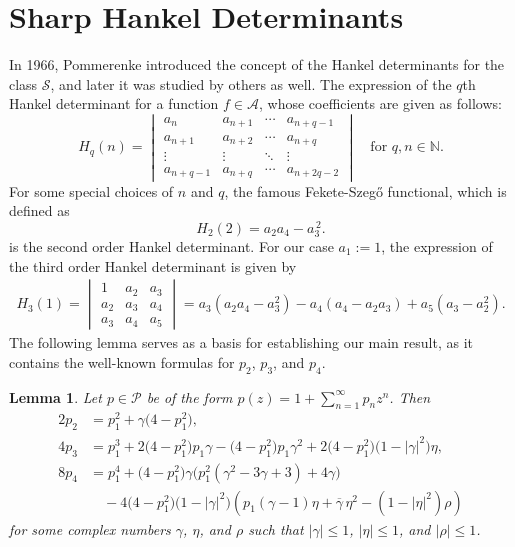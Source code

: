 \documentclass[a4paper,12pt,reqno]{amsart} %
\numberwithin{equation}{section}
\newtheorem{lem}{Lemma}[section]
\theoremstyle{definition}
\newcounter{own}
\begin{document}
\section{Sharp Hankel Determinants}
In 1966, Pommerenke \cite{Pommerenke1966} introduced the concept of the Hankel determinants for the class $\mathcal{S}$, and later it was studied by others as well. The expression of the $q$th Hankel determinant for a function $f \in \mathcal{A}$, whose coefficients are given as follows:
\[
H_q(n) =
\begin{vmatrix}
a_n & a_{n+1} & \cdots & a_{n+q-1} \\
a_{n+1} & a_{n+2} & \cdots & a_{n+q} \\
\vdots & \vdots & \ddots & \vdots \\
a_{n+q-1} & a_{n+q} & \cdots & a_{n+2q-2}
\end{vmatrix}
\quad \mbox{for } q, n \in \mathbb{N}.
\]
For some special choices of $n$ and $q$,   the famous Fekete-Szegő functional, which is defined as 
\begin{equation}\label{eq:4.1}
H_2(2) = a_2 a_4 - a_3^{\,2}.
\end{equation}
is the second order Hankel determinant. For our case $a_1 := 1$, the expression of the third order Hankel determinant is given by
\begin{align*}
H_3(1) =
\begin{vmatrix}
1 & a_2 & a_3 \\
a_2 & a_3 & a_4 \\
a_3 & a_4 & a_5
\end{vmatrix}
= a_3(a_2 a_4 - a_3^2) - a_4(a_4 - a_2 a_3) + a_5(a_3 - a_2^2).
\end{align*}
The following lemma serves as a basis for establishing our main result, as it contains the well-known formulas for $p_2$, $p_3$, and $p_4$.
\begin{lem} {\label{lemma2}}\textnormal{{ \cite{LiberaZlotkiewicz1982}}}
Let $p \in \mathcal{P}$ be of the form $p(z) = 1 + \sum_{n=1}^{\infty} p_n z^n$. Then
\begin{align*}
2 p_2 &= p_1^2 + \gamma \bigl(4 - p_1^2\bigr), \\
4 p_3 &= p_1^3 + 2\bigl(4 - p_1^2\bigr)p_1 \gamma
- \bigl(4 - p_1^2\bigr)p_1 \gamma^2
+ 2\bigl(4 - p_1^2\bigr)\bigl(1 - |\gamma|^2\bigr)\eta, \\
8 p_4 &= p_1^4
+ \bigl(4 - p_1^2\bigr)\gamma\bigl(p_1^2(\gamma^2 - 3\gamma + 3) + 4\gamma\bigr)
\\
&\quad- 4\bigl(4 - p_1^2\bigr)\bigl(1 - |\gamma|^2\bigr)
\left(p_1(\gamma - 1)\eta + \overline{\gamma}\,\eta^2
- (1 - |\eta|^2)\rho\right)
\end{align*}
for some complex numbers $\gamma$, $\eta$, and $\rho$ such that $|\gamma| \leq 1$, $|\eta| \leq 1$, and $|\rho| \leq 1$.
\end{lem}
\end{document}
